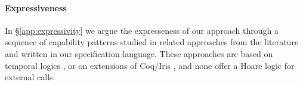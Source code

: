 \newcommand{\paragraphSDD}[1]{\vspace{.02cm}{\textit{#1}}}
 
 \paragraph{Expressiveness} 

In  \S \ref{app:expressivity} we argue the expresseness of our approach  through a sequence of capability patterns studied in related approaches from the literature  
 \cite{OOPSLA22,dd,VerX,irisWasm23,ddd} and written in our specification language.
These approaches %
 are based on temporal logics \cite{VerX,OOPSLA22}, or on extensions of Coq/Iris \cite{dd,irisWasm23,ddd}, and
none offer a Hoare logic    for external calls.

 

